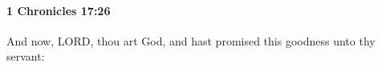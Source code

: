 
		\paragraph{1 Chronicles 17:26} %
			\label{1CHRONICLES-17-26}

			And now, LORD, thou art God, and hast promised this goodness unto thy servant:


